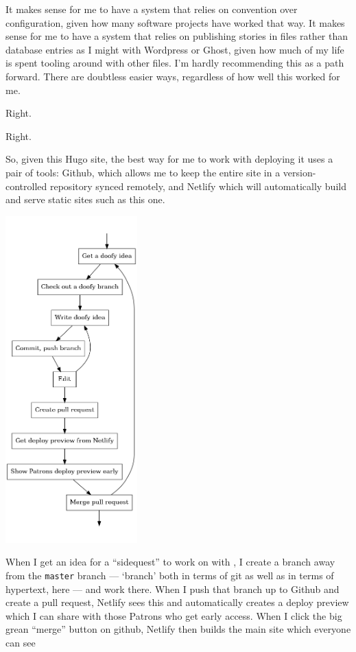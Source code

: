 \begin{paracol}{2}
\begin{leftcolumn}
It makes sense for me to have a system that relies on convention over configuration, given how many software projects have worked that way. It makes sense for me to have a system that relies on publishing stories in files rather than database entries as I might with Wordpress or Ghost, given how much of my life is spent tooling around with other files. I'm hardly recommending this as a path forward. There are doubtless easier ways, regardless of how well this worked for me.

\begin{ally}
  Right.
\end{ally}
Right.

So, given this Hugo site, the best way for me to work with deploying it uses a pair of tools: Github, which allows me to keep the entire site in a version-controlled repository synced remotely, and Netlify which will automatically build and serve static sites such as this one.
\end{leftcolumn}
\begin{rightcolumn*}
\includegraphics[width=2in]{assets/workflow.png}
\end{rightcolumn*}
\begin{leftcolumn}

When I get an idea for a ``sidequest'' to work on with \allyWord, I create a branch away from the \texttt{master} branch --- `branch' both in terms of git as well as in terms of hypertext, here --- and work there. When I push that branch up to Github and create a pull request, Netlify sees this and automatically creates a deploy preview which I can share with those Patrons who get early access. When I click the big grean ``merge'' button on github, Netlify then builds the main site which everyone can see
\newpage
\end{leftcolumn}
\end{paracol}
